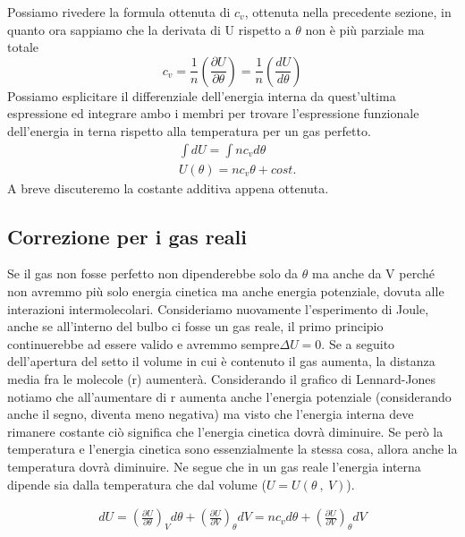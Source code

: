 \documentclass[
10pt, %
a4paper, %
oneside, %
headinclude,footinclude, %
BCOR5mm, %
]{scrartcl}
\begin{document}
Possiamo rivedere la formula ottenuta di \(c_v\), ottenuta nella precedente sezione, in quanto ora sappiamo che la derivata di U rispetto a $\theta$ non è più parziale ma totale
\[c_v =\frac{1}{n}\left(\frac{\partial U}{\partial\theta}\right)=\frac{1}{n}\left(\frac{dU}{d\theta}\right)\]
Possiamo esplicitare il differenziale dell'energia interna da quest'ultima espressione ed integrare ambo i membri per trovare l'espressione funzionale dell'energia in terna rispetto alla temperatura per un gas perfetto.
\begin{align}\label{eq:U_gas_perfetti}
	&\int dU = \int n c_v d\theta\nonumber\\
	&U(\theta) = n c_v \theta + cost.
\end{align} 
A breve discuteremo la costante additiva appena ottenuta.
\subsection{Correzione per i gas reali}
Se il gas non fosse perfetto non dipenderebbe solo da $\theta$ ma anche da V perché non avremmo più solo energia cinetica ma anche energia potenziale, dovuta alle interazioni intermolecolari. Consideriamo nuovamente l'esperimento di Joule, anche se all'interno del bulbo ci fosse un gas reale, il primo principio continuerebbe ad essere valido e avremmo sempre\(\Delta U = 0\). Se a seguito dell'apertura del setto il volume in cui è contenuto il gas aumenta, la distanza media fra le molecole (r) aumenterà. Considerando il grafico di Lennard-Jones notiamo che all'aumentare di r aumenta anche l'energia potenziale (considerando anche il segno, diventa meno negativa) ma visto che l'energia interna deve rimanere costante ciò significa che l'energia cinetica dovrà diminuire. Se però la temperatura e l'energia cinetica sono essenzialmente la stessa cosa, allora anche la temperatura dovrà diminuire. Ne segue che in un gas reale l'energia interna dipende sia dalla temperatura che dal volume (\(U = U(\theta\ ,\ V)\)). 

\begin{align*} 
	dU = \left(\frac{\partial U}{\partial \theta}\right)_V d\theta + \left(\frac{\partial U}{\partial V}\right)_{\theta} dV = n c_v d\theta +\left(\frac{\partial U}{\partial V}\right)_{\theta}dV
\end{align*} 
\end{document}
